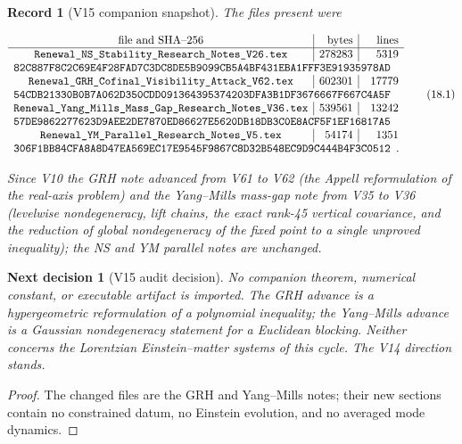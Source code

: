 \documentclass[11pt]{article}
\newtheorem{decision}[theorem]{Next decision}
\newtheorem{record}[theorem]{Record}
\theoremstyle{remark}
\begin{document}
\begin{record}[V15 companion snapshot]
\label{rec:v20v15-snapshot}
The files present were

\[
\begin{array}{c|r|r}
\hbox{file and SHA--256}&\hbox{bytes}&\hbox{lines}\\ \hline
\texttt{Renewal\_NS\_Stability\_Research\_Notes\_V26.tex}
&278283&5319\\
\multicolumn{3}{l}{
\texttt{82C887F8C2C69E4F28FAD7C3DC8DE5B9099CB5A4BF431EBA1FFF3E91935978AD}}
\\
\texttt{Renewal\_GRH\_Cofinal\_Visibility\_Attack\_V62.tex}
&602301&17779\\
\multicolumn{3}{l}{
\texttt{54CDB21330B0B7A062D350CDD091364395374203DFA3B1DF3676667F667C4A5F}}
\\
\texttt{Renewal\_Yang\_Mills\_Mass\_Gap\_Research\_Notes\_V36.tex}
&539561&13242\\
\multicolumn{3}{l}{
\texttt{57DE9862277623D9AEE2DE7870ED86627E5620DB18DB3C0E8ACF5F1EF16817A5}}
\\
\texttt{Renewal\_YM\_Parallel\_Research\_Notes\_V5.tex}
&54174&1351\\
\multicolumn{3}{l}{
\texttt{306F1BB84CFA8A8D47EA569EC17E9545F9867C8D32B548EC9D9C444B4F3C0512}}.
\end{array}                                                     \tag{18.1}
\]

Since V10 the GRH note advanced from V61 to V62 (the Appell
reformulation of the real-axis problem) and the Yang--Mills mass-gap
note from V35 to V36 (levelwise nondegeneracy, lift chains, the exact
rank-45 vertical covariance, and the reduction of global
nondegeneracy of the fixed point to a single unproved inequality);
the NS and YM parallel notes are unchanged.
\end{record}

\begin{decision}[V15 audit decision]
\label{dec:v20v15-audit}
No companion theorem, numerical constant, or executable artifact is
imported.  The GRH advance is a hypergeometric reformulation of a
polynomial inequality; the Yang--Mills advance is a Gaussian
nondegeneracy statement for a Euclidean blocking.  Neither concerns
the Lorentzian Einstein--matter systems of this cycle.  The V14
direction stands.
\end{decision}

\begin{proof}
The changed files are the GRH and Yang--Mills notes; their new
sections contain no constrained datum, no Einstein evolution, and no
averaged mode dynamics.
\end{proof}
\end{document}
